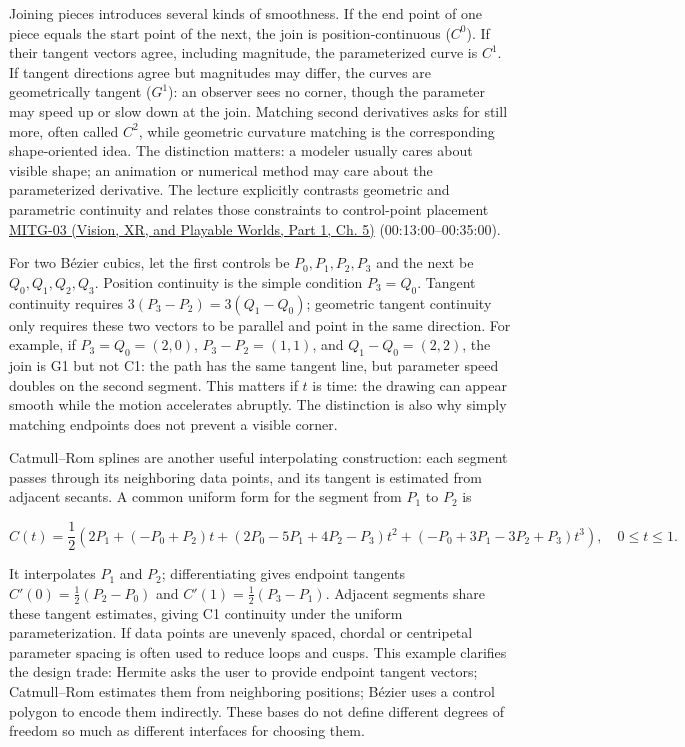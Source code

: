 Joining pieces introduces several kinds of smoothness. If the end point of one piece equals the start point of the next, the join is position-continuous (\(C^0\)). If their tangent vectors agree, including magnitude, the parameterized curve is \(C^1\). If tangent directions agree but magnitudes may differ, the curves are geometrically tangent (\(G^1\)): an observer sees no corner, though the parameter may speed up or slow down at the join. Matching second derivatives asks for still more, often called \(C^2\), while geometric curvature matching is the corresponding shape-oriented idea. The distinction matters: a modeler usually cares about visible shape; an animation or numerical method may care about the parameterized derivative. The lecture explicitly contrasts geometric and parametric continuity and relates those constraints to control-point placement \href{../07-Vision-XR-and-Playable-Worlds-P01/main.pdf\#nameddest=04-visual-computing-ii-ch036-mitg-03---curves-and-surfaces}{MITG-03 (Vision, XR, and Playable Worlds, Part 1, Ch. 5)} (00:13:00--00:35:00).

For two Bézier cubics, let the first controls be \(P_0,P_1,P_2,P_3\) and the next be \(Q_0,Q_1,Q_2,Q_3\). Position continuity is the simple condition \(P_3=Q_0\). Tangent continuity requires \(3(P_3-P_2)=3(Q_1-Q_0)\); geometric tangent continuity only requires these two vectors to be parallel and point in the same direction. For example, if \(P_3=Q_0=(2,0)\), \(P_3-P_2=(1,1)\), and \(Q_1-Q_0=(2,2)\), the join is G1 but not C1: the path has the same tangent line, but parameter speed doubles on the second segment. This matters if \(t\) is time: the drawing can appear smooth while the motion accelerates abruptly. The distinction is also why simply matching endpoints does not prevent a visible corner.

Catmull--Rom splines are another useful interpolating construction: each segment passes through its neighboring data points, and its tangent is estimated from adjacent secants. A common uniform form for the segment from \(P_1\) to \(P_2\) is

\[
C(t)=\frac12\left(2P_1+(-P_0+P_2)t+(2P_0-5P_1+4P_2-P_3)t^2+(-P_0+3P_1-3P_2+P_3)t^3\right),\quad 0\le t\le1.
\]

It interpolates \(P_1\) and \(P_2\); differentiating gives endpoint tangents \(C'(0)=\frac12(P_2-P_0)\) and \(C'(1)=\frac12(P_3-P_1)\). Adjacent segments share these tangent estimates, giving C1 continuity under the uniform parameterization. If data points are unevenly spaced, chordal or centripetal parameter spacing is often used to reduce loops and cusps. This example clarifies the design trade: Hermite asks the user to provide endpoint tangent vectors; Catmull--Rom estimates them from neighboring positions; Bézier uses a control polygon to encode them indirectly. These bases do not define different degrees of freedom so much as different interfaces for choosing them.

